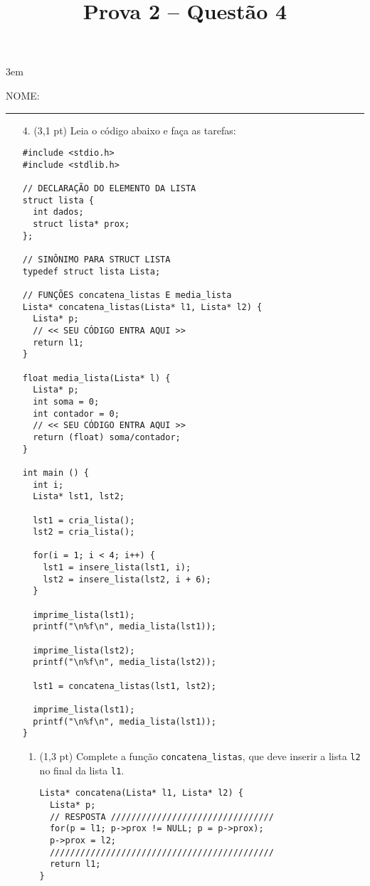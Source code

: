 \documentclass[a4paper,10pt]{article}
\title{Prova 2 -- Questão 4}
\begin{document}
\maketitle

\emergencystretch 3em



NOME: \rule{.85\textwidth}{0.1mm}

\begin{multicols*}{2}
\setlength{\leftmargini}{0pt}
\begin{enumerate}
  \item [4.] (3,1 pt) Leia o código abaixo e faça as tarefas:

  \begin{verbatim}
#include <stdio.h>
#include <stdlib.h>

// DECLARAÇÃO DO ELEMENTO DA LISTA
struct lista {
  int dados;
  struct lista* prox;
};

// SINÔNIMO PARA STRUCT LISTA
typedef struct lista Lista;

// FUNÇÕES concatena_listas E media_lista
Lista* concatena_listas(Lista* l1, Lista* l2) {
  Lista* p;
  // << SEU CÓDIGO ENTRA AQUI >>
  return l1;
}

float media_lista(Lista* l) {
  Lista* p;
  int soma = 0;
  int contador = 0;
  // << SEU CÓDIGO ENTRA AQUI >>
  return (float) soma/contador;
}

int main () {
  int i;
  Lista* lst1, lst2;

  lst1 = cria_lista();
  lst2 = cria_lista();

  for(i = 1; i < 4; i++) {
    lst1 = insere_lista(lst1, i);
    lst2 = insere_lista(lst2, i + 6);
  }

  imprime_lista(lst1);
  printf("\n%f\n", media_lista(lst1));

  imprime_lista(lst2);
  printf("\n%f\n", media_lista(lst2));

  lst1 = concatena_listas(lst1, lst2);

  imprime_lista(lst1);
  printf("\n%f\n", media_lista(lst1));
}
  \end{verbatim}

  \vfill\null
  \columnbreak

  \begin{enumerate}
    \item (1,3 pt) Complete a função \texttt{concatena\_listas}, que deve inserir a lista \texttt{l2} no final da lista \texttt{l1}.

    \begin{verbatim}
Lista* concatena(Lista* l1, Lista* l2) {
  Lista* p;
  // RESPOSTA ////////////////////////////////
  for(p = l1; p->prox != NULL; p = p->prox);
  p->prox = l2;
  ////////////////////////////////////////////
  return l1;
}
    \end{verbatim}


\end{enumerate}
\end{enumerate}
\end{multicols*}
\end{document}
